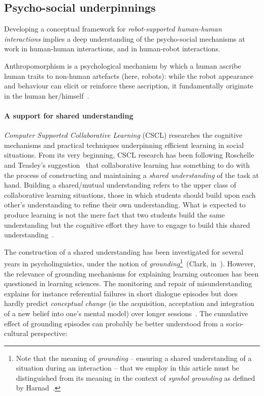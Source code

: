 \documentclass[11pt]{report}
\begin{document}
\subsection{Psycho-social underpinnings}

Developing a conceptual framework for \emph{robot-supported human-human
interactions} implies a deep understanding of the psycho-social mechanisms at
work in human-human interactions, and in human-robot interactions.

Anthropomorphism is a psychological mechanism by which a human
ascribe human traits to non-human artefacts (here, robots): while the
robot appearance and behaviour can elicit or reinforce these ascription,
it fundamentally originate in the human her/himself~\cite{fink}.


\paragraph{A support for shared understanding}

\emph{Computer Supported Collaborative Learning} (CSCL) researches the cognitive
mechanisms and practical techniques underpinning efficient learning in social
situations. From its very beginning, CSCL research has been following
Roschelle and Teasley's suggestion~\cite{roschelle1995construction} that
collaborative learning has something to do with the process of constructing and
maintaining a \emph{shared understanding} of the task at hand. Building a shared/mutual
understanding refers to the upper class of collaborative learning situations,
those in which students should build upon each other's understanding to refine
their own understanding.  What is expected to produce learning is not the mere
fact that two students build the same understanding but the cognitive effort
they have to engage to build this shared
understanding~\cite{schwartz1995emergence}.

The construction of a shared understanding has been investigated for several
years in psycholinguistics, under the  notion of \emph{grounding}\footnote{Note
that the meaning of \emph{grounding} -- ensuring a shared understanding of a
situation during an interaction -- that we employ in this article must be
distinguished from its meaning in the context of \emph{symbol grounding} as
defined by Harnad~\cite{harnad1990symbol}.}~(Clark,
in~\cite{clark1986referring}).  However, the relevance of grounding mechanisms
for explaining learning outcomes has been questioned in learning sciences. The
monitoring and repair of misunderstanding explains for instance referential
failures in short dialogue episodes but does hardly predict \emph{conceptual
change} (ie the acquisition, acceptation and integration of a new belief into
one's mental model) over longer
sessions~\cite{dillenbourg2006sharing}. The cumulative effect of grounding
episodes can probably be better understood from a socio-cultural perspective:
\end{document}

